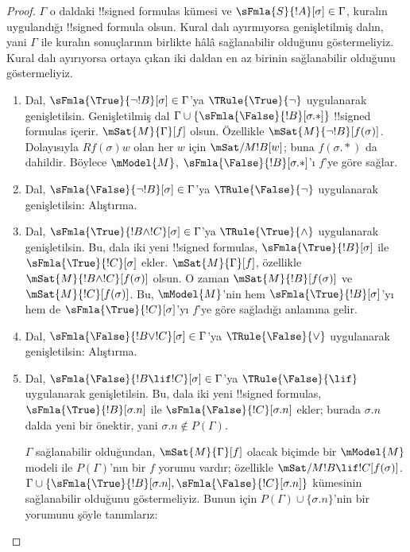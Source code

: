 \begin{proof}
$\Gamma$ o daldaki !!{signed formula}s kümesi ve
$\sFmla{S}{!A}[\sigma] \in \Gamma$, kuralın uygulandığı !!{signed formula}
olsun. Kural dalı ayırmıyorsa genişletilmiş dalın, yani $\Gamma$ ile kuralın
sonuçlarının birlikte hâlâ sağlanabilir olduğunu göstermeliyiz. Kural dalı
ayırıyorsa ortaya çıkan iki daldan en az birinin sağlanabilir olduğunu
göstermeliyiz.
\begin{enumerate}
\item Dal, $\sFmla{\True}{\lnot !B}[\sigma] \in \Gamma$'ya
  $\TRule{\True}{\lnot}$ uygulanarak genişletilsin. Genişletilmiş dal
  $\Gamma \cup \{\sFmla{\False}{!B}[\sigma.{*}]\}$ !!{signed formula}s
  içerir. $\mSat{M}{\Gamma}[f]$ olsun. Özellikle
  $\mSat{M}{\lnot !B}[f(\sigma)]$. Dolayısıyla $Rf(\sigma)w$ olan her $w$
  için $\mSat/{M}{!B}[w]$; buna $f(\sigma.{*})$ da dahildir. Böylece
  $\mModel{M}$, $\sFmla{\False}{!B}[\sigma.{*}]$'ı $f$'ye göre sağlar.
\item Dal, $\sFmla{\False}{\lnot !B}[\sigma] \in \Gamma$'ya
  $\TRule{\False}{\lnot}$ uygulanarak genişletilsin: Alıştırma.
\item Dal, $\sFmla{\True}{!B \land !C}[\sigma] \in \Gamma$'ya
  $\TRule{\True}{\land}$ uygulanarak genişletilsin. Bu, dala iki yeni
  !!{signed formula}s, $\sFmla{\True}{!B}[\sigma]$ ile
  $\sFmla{\True}{!C}[\sigma]$ ekler. $\mSat{M}{\Gamma}[f]$, özellikle
  $\mSat{M}{!B \land !C}[f(\sigma)]$ olsun. O zaman
  $\mSat{M}{!B}[f(\sigma)]$ ve $\mSat{M}{!C}[f(\sigma)]$. Bu,
  $\mModel{M}$'nin hem $\sFmla{\True}{!B}[\sigma]$'yı hem de
  $\sFmla{\True}{!C}[\sigma]$'yı $f$'ye göre sağladığı anlamına gelir.
\item Dal, $\sFmla{\False}{!B \lor !C}[\sigma] \in \Gamma$'ya
  $\TRule{\False}{\lor}$ uygulanarak genişletilsin: Alıştırma.
\item Dal, $\sFmla{\False}{!B \lif !C}[\sigma] \in \Gamma$'ya
  $\TRule{\False}{\lif}$ uygulanarak genişletilsin. Bu, dala iki yeni
  !!{signed formula}s, $\sFmla{\True}{!B}[\sigma.n]$ ile
  $\sFmla{\False}{!C}[\sigma.n]$ ekler; burada $\sigma.n$ dalda yeni bir
  önektir, yani $\sigma.n \notin P(\Gamma)$.

  $\Gamma$ sağlanabilir olduğundan, $\mSat{M}{\Gamma}[f]$ olacak biçimde bir
  $\mModel{M}$ modeli ile $P(\Gamma)$'nın bir $f$ yorumu vardır; özellikle
  $\mSat/{M}{!B \lif !C}[f(\sigma)]$. $\Gamma \cup
  \{\sFmla{\True}{!B}[\sigma.n],
  \sFmla{\False}{!C}[\sigma.n]\}$ kümesinin sağlanabilir olduğunu
  göstermeliyiz. Bunun için $P(\Gamma) \cup \{\sigma.n\}$'nin bir yorumunu
  şöyle tanımlarız:


\end{enumerate}
\end{proof}

